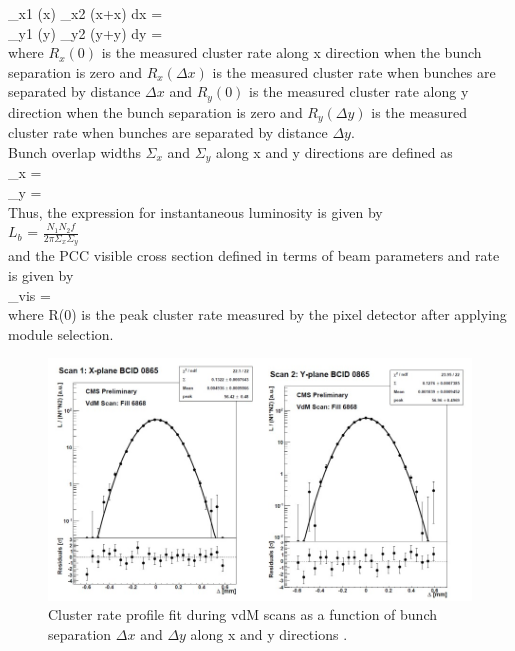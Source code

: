 \int \rho_{x1} (x) \rho_{x2} (x+\Delta x) dx =  \\


\int \rho_{y1} (y) \rho_{y2} (y+\Delta y) dy =  \\

where $R_x(0)$ is the measured cluster rate along x direction when the bunch separation is zero and $R_x(\Delta x)$ is the measured cluster rate when bunches are separated by distance $\Delta x$ and $R_y(0)$ is the measured cluster rate along y direction when the bunch separation is zero and $R_y(\Delta y)$ is the measured cluster rate when bunches are separated by distance $\Delta y$. \\

Bunch overlap widths $\Sigma_x$ and $\Sigma_y$ along x and y directions are defined as \\

\Sigma_x =   \\

\Sigma_y =    \\

Thus, the expression for instantaneous luminosity is given by \\

$L_{b}$ = $\frac{N_1 N_2 f}{2\pi \Sigma_x \Sigma_y}$ \\

and the PCC visible cross section defined in terms of beam parameters and rate is given by \\

\sigma_{vis} =  \\

where R(0) is the peak cluster rate measured by the pixel detector after applying module selection.\\



\begin{figure}[H]
  \centering
  \includegraphics[width=0.7\columnwidth]{./cropped.jpg}
  \caption{ \onehalfspacing Cluster rate profile fit during vdM scans as a function of bunch separation $\Delta x$ and $\Delta y$ along x and y directions \cite{CMS-PAS-LUM-15-001}.}
  \label{fig:CMS}
\end{figure}








